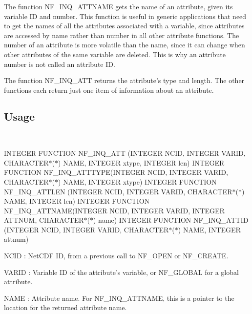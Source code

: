 The function N\+F\+\_\+\+I\+N\+Q\+\_\+\+A\+T\+T\+N\+A\+ME gets the name of an attribute, given its variable ID and number. This function is useful in generic applications that need to get the names of all the attributes associated with a variable, since attributes are accessed by name rather than number in all other attribute functions. The number of an attribute is more volatile than the name, since it can change when other attributes of the same variable are deleted. This is why an attribute number is not called an attribute ID.

The function N\+F\+\_\+\+I\+N\+Q\+\_\+\+A\+TT returns the attribute’s type and length. The other functions each return just one item of information about an attribute.

\subsection*{Usage }

 

I\+N\+T\+E\+G\+ER F\+U\+N\+C\+T\+I\+ON N\+F\+\_\+\+I\+N\+Q\+\_\+\+A\+TT (I\+N\+T\+E\+G\+ER N\+C\+ID, I\+N\+T\+E\+G\+ER V\+A\+R\+ID, C\+H\+A\+R\+A\+C\+T\+E\+R$\ast$($\ast$) N\+A\+ME, I\+N\+T\+E\+G\+ER xtype, I\+N\+T\+E\+G\+ER len) I\+N\+T\+E\+G\+ER F\+U\+N\+C\+T\+I\+ON N\+F\+\_\+\+I\+N\+Q\+\_\+\+A\+T\+T\+T\+Y\+PE(I\+N\+T\+E\+G\+ER N\+C\+ID, I\+N\+T\+E\+G\+ER V\+A\+R\+ID, C\+H\+A\+R\+A\+C\+T\+E\+R$\ast$($\ast$) N\+A\+ME, I\+N\+T\+E\+G\+ER xtype) I\+N\+T\+E\+G\+ER F\+U\+N\+C\+T\+I\+ON N\+F\+\_\+\+I\+N\+Q\+\_\+\+A\+T\+T\+L\+EN (I\+N\+T\+E\+G\+ER N\+C\+ID, I\+N\+T\+E\+G\+ER V\+A\+R\+ID, C\+H\+A\+R\+A\+C\+T\+E\+R$\ast$($\ast$) N\+A\+ME, I\+N\+T\+E\+G\+ER len) I\+N\+T\+E\+G\+ER F\+U\+N\+C\+T\+I\+ON N\+F\+\_\+\+I\+N\+Q\+\_\+\+A\+T\+T\+N\+A\+ME(I\+N\+T\+E\+G\+ER N\+C\+ID, I\+N\+T\+E\+G\+ER V\+A\+R\+ID, I\+N\+T\+E\+G\+ER A\+T\+T\+N\+UM, C\+H\+A\+R\+A\+C\+T\+E\+R$\ast$($\ast$) name) I\+N\+T\+E\+G\+ER F\+U\+N\+C\+T\+I\+ON N\+F\+\_\+\+I\+N\+Q\+\_\+\+A\+T\+T\+ID (I\+N\+T\+E\+G\+ER N\+C\+ID, I\+N\+T\+E\+G\+ER V\+A\+R\+ID, C\+H\+A\+R\+A\+C\+T\+E\+R$\ast$($\ast$) N\+A\+ME, I\+N\+T\+E\+G\+ER attnum)

{\ttfamily N\+C\+ID} \+: Net\+C\+DF ID, from a previous call to N\+F\+\_\+\+O\+P\+EN or N\+F\+\_\+\+C\+R\+E\+A\+TE.

{\ttfamily V\+A\+R\+ID} \+: Variable ID of the attribute’s variable, or N\+F\+\_\+\+G\+L\+O\+B\+AL for a global attribute.

{\ttfamily N\+A\+ME} \+: Attribute name. For N\+F\+\_\+\+I\+N\+Q\+\_\+\+A\+T\+T\+N\+A\+ME, this is a pointer to the location for the returned attribute name.

